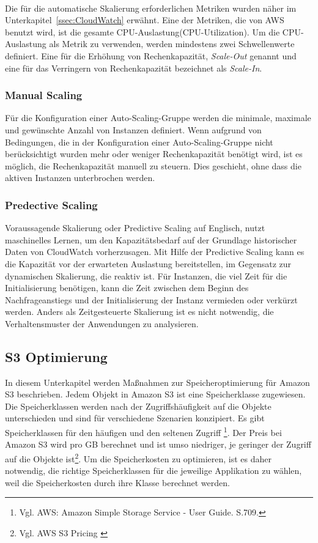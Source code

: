 \\
Die für die automatische Skalierung erforderlichen Metriken wurden näher im Unterkapitel~\ref{ssec:CloudWatch} erwähnt. Eine der Metriken, die von AWS %
benutzt wird, ist die gesamte CPU-Auslastung(CPU-Utilization). 
Um die CPU-Auslastung als Metrik zu verwenden, werden mindestens zwei Schwellenwerte definiert. Eine für die Erhöhung von Rechenkapazität, \textit{Scale-Out} genannt und eine für das Verringern von Rechenkapazität bezeichnet als \textit{Scale-In}.

\subsubsection{Manual Scaling}
Für die Konfiguration einer Auto-Scaling-Gruppe werden die minimale, maximale und gewünschte Anzahl von Instanzen definiert. Wenn aufgrund von Bedingungen, die in der Konfiguration einer Auto-Scaling-Gruppe nicht berücksichtigt wurden mehr oder weniger Rechenkapazität benötigt wird, ist es möglich, die Rechenkapazität manuell zu steuern. Dies geschieht, ohne dass die aktiven Instanzen unterbrochen werden.

\subsubsection{Predective Scaling}%
Voraussagende Skalierung oder Predictive Scaling auf Englisch, nutzt maschinelles Lernen, um den Kapazitätsbedarf auf der Grundlage historischer Daten von CloudWatch vorherzusagen. Mit Hilfe der Predictive Scaling kann es die Kapazität vor der erwarteten Auslastung bereitstellen, im Gegensatz zur dynamischen Skalierung, die reaktiv ist. 
Für Instanzen, die viel Zeit für die Initialisierung benötigen, kann die Zeit zwischen dem Beginn des Nachfrageanstiegs und der Initialisierung der Instanz vermieden oder verkürzt werden.
Anders als Zeitgesteuerte Skalierung ist es nicht notwendig, die Verhaltensmuster der Anwendungen zu analysieren.

\subsection{S3 Optimierung}
In diesem Unterkapitel werden Maßnahmen zur Speicheroptimierung für Amazon S3 beschrieben. Jedem Objekt in Amazon S3 ist eine Speicherklasse zugewiesen. Die Speicherklassen werden nach der Zugriffshäufigkeit auf die Objekte unterschieden und sind für verschiedene Szenarien konzipiert. Es gibt Speicherklassen für den häufigen und den seltenen Zugriff \footnote{Vgl. AWS: Amazon Simple Storage Service - User Guide. S.709.\cite{AMZ18}}. Der Preis bei Amazon S3 wird pro GB berechnet und ist umso niedriger, je geringer der Zugriff auf die Objekte ist\footnote{Vgl. AWS S3 Pricing \cite{AMZ09}}. Um die Speicherkosten zu optimieren, ist es daher notwendig, die richtige Speicherklassen für die jeweilige Applikation zu wählen, weil die Speicherkosten durch ihre Klasse berechnet werden.

